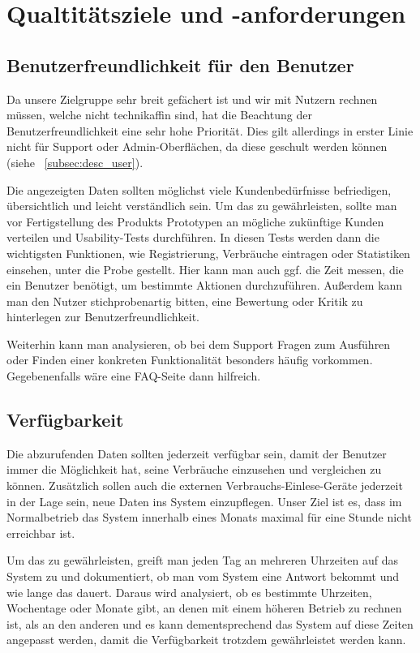 \section{Qualtitätsziele und -anforderungen}
\label{quality_requirements}

\subsection{Benutzerfreundlichkeit für den Benutzer}
Da unsere Zielgruppe sehr breit gefächert ist und wir mit Nutzern rechnen müssen, welche nicht technikaffin sind,
hat die Beachtung der Benutzerfreundlichkeit eine sehr hohe Priorität.
Dies gilt allerdings in erster Linie nicht für Support oder Admin-Oberflächen, da diese geschult werden können (siehe ~\ref{subsec:desc_user}).

Die angezeigten Daten sollten möglichst viele Kundenbedürfnisse
befriedigen, übersichtlich und leicht verständlich sein.
Um das zu gewährleisten, sollte man vor Fertigstellung des Produkts Prototypen an mögliche zukünftige Kunden verteilen
und Usability-Tests durchführen.
In diesen Tests werden dann die wichtigsten Funktionen, wie Registrierung, Verbräuche eintragen oder Statistiken einsehen,
unter die Probe gestellt.
Hier kann man auch ggf. die Zeit messen, die ein Benutzer benötigt, um bestimmte Aktionen durchzuführen.
Außerdem kann man den Nutzer stichprobenartig bitten, eine Bewertung oder Kritik zu hinterlegen zur Benutzerfreundlichkeit.

Weiterhin kann man analysieren, ob bei dem Support Fragen zum Ausführen oder Finden einer konkreten Funktionalität
besonders häufig vorkommen.
Gegebenenfalls wäre eine FAQ-Seite dann hilfreich.

\subsection{Verfügbarkeit}
Die abzurufenden Daten sollten jederzeit verfügbar sein,
damit der Benutzer immer die Möglichkeit hat,
seine Verbräuche einzusehen und vergleichen zu können.
Zusätzlich sollen auch die externen Verbrauchs-Einlese-Geräte jederzeit in der Lage sein, neue Daten ins System
einzupflegen.
Unser Ziel ist es, dass im Normalbetrieb das System innerhalb eines Monats maximal für eine Stunde nicht erreichbar ist.

Um das zu gewährleisten, greift man jeden Tag an mehreren Uhrzeiten auf das System zu
und dokumentiert, ob man vom System eine Antwort bekommt und wie lange das dauert.
Daraus wird analysiert, ob es bestimmte Uhrzeiten, Wochentage oder Monate gibt,
an denen mit einem höheren Betrieb zu rechnen ist, als an den anderen und es kann dementsprechend das
System auf diese Zeiten angepasst werden, damit die Verfügbarkeit trotzdem gewährleistet werden kann.

